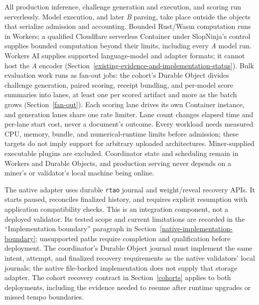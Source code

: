 All production inference, challenge generation and execution, and scoring run
serverlessly. Model execution, and later \textit{B} parsing, take place
outside the objects that serialize admission and accounting. Bounded Rust/Wasm computation runs in
Workers; a qualified Cloudflare serverless Container under SlopNinja's control
supplies bounded computation beyond their limits, including every \textit{A}
model run. Workers AI supplies supported language-model and adapter formats; it
cannot host the \textit{A} encoder
(Section~\ref{existing-evidence-and-implementation-status}). Bulk evaluation
work runs as fan-out jobs: the cohort's Durable Object divides challenge
generation, paired scoring, receipt bundling, and per-model score summaries
into lanes, at least one per scored artifact and more as the batch grows
(Section~\ref{fan-out}). Each scoring lane drives its own Container instance,
and generation lanes share one rate limiter. Lane count changes elapsed time and
per-lane start cost, never a document's outcome. Every workload needs measured CPU, memory, bundle,
and numerical-runtime limits before admission; these targets do not imply
support for arbitrary uploaded architectures. Miner-supplied executable plugins
are excluded. Coordinator state and scheduling remain in Workers and Durable
Objects, and production serving never depends on a miner's or validator's local
machine being online.

The native adapter uses durable \texttt{rtao} journal and weight/reveal recovery
APIs. It starts paused, reconciles finalized history, and requires explicit
resumption with application compatibility checks. This is an integration
component, not a deployed validator. Its tested scope and current limitations
are recorded in the ``Implementation boundary'' paragraph in
Section~\ref{native-implementation-boundary}; unsupported paths
require completion and qualification before deployment. The coordinator's
Durable Object journal must implement the same intent, attempt, and finalized
recovery requirements as the native validators' local journals; the native
file-backed implementation does not supply that storage adapter. The cohort
recovery contract in Section~\ref{cohorts} applies to both deployments, including
the evidence needed to resume after runtime upgrades or missed tempo boundaries.
